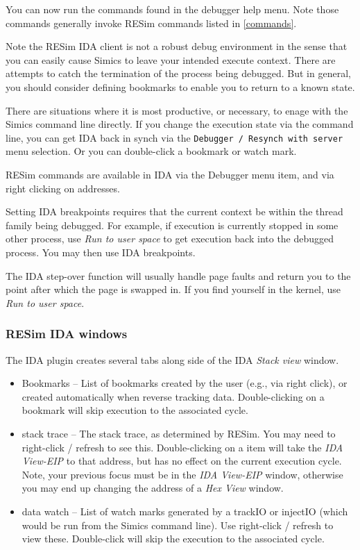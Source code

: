 \documentclass[titlepage]{article}
\begin{document}
You can now run the commands found in the debugger help menu.  Note those commands generally invoke RESim commands listed in \ref{commands}.

Note the RESim IDA client is not a robust debug environment in the sense that you can easily cause Simics to leave your intended execute context.
There are attempts to catch the termination of the process being debugged.  But in general, you should consider defining bookmarks to enable you to
return to a known state.  

There are situations where it is most productive, or necessary, to enage with the Simics command line directly.  If you change the execution state
via the command line, you can get IDA back in synch via the {\tt Debugger / Resynch with server} menu selection.  Or you can double-click a bookmark
or watch mark.

RESim commands are available in IDA via the Debugger menu item, and via right clicking on addresses.  

Setting IDA breakpoints requires that the current context be within the thread family being debugged.  For example, if execution is currently 
stopped in some other process, use \textit{Run to user space} to get execution back into the debugged process.  You may then use IDA breakpoints.

The IDA step-over function will usually handle page faults and return you to the point after which the page is swapped in.  If you find yourself in
the kernel, use \textit{Run to user space}.


\subsubsection{RESim IDA windows}
The IDA plugin creates several tabs along side of the IDA \textit{Stack view} window.  
\begin{itemize}
\item Bookmarks -- List of bookmarks created by the user (e.g., via right click), or created automatically when reverse tracking data.
Double-clicking on a bookmark will skip execution to the associated cycle.
\item stack trace -- The stack trace, as determined by RESim.  You may need to right-click / refresh to see this.  Double-clicking on a item
will take the \textit{IDA View-EIP} to that address, but has no effect on the current execution cycle.  Note, your previous focus must be in
the \textit{IDA View-EIP} window, otherwise you may end up changing the address of a \textit{Hex View} window.
\item data watch -- List of watch marks generated by a trackIO or injectIO (which would be run from the Simics command line).  
Use right-click / refresh to view these.  Double-click will skip the execution to the associated cycle.
\end{itemize}
\end{document}
